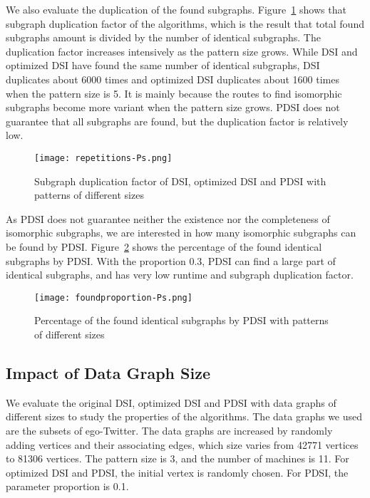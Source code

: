 We also evaluate the duplication of the found subgraphs. Figure~\ref{fig:repetitions-P} shows that subgraph duplication factor of the algorithms, which is the result that total found subgraphs amount is divided by the number of identical subgraphs. The duplication factor increases intensively as the pattern size grows. While DSI and optimized DSI have found the same number of identical subgraphs, DSI duplicates about 6000 times and optimized DSI duplicates about 1600 times when the pattern size is 5. It is mainly because the routes to find isomorphic subgraphs become more variant when the pattern size grows. PDSI does not guarantee that all subgraphs are found, but the duplication factor is relatively low.

\begin{figure}[H]
  \begin{center}
    \texttt{[image: repetitions-Ps.png]}
    \caption{Subgraph duplication factor of DSI, optimized DSI and PDSI with patterns of different sizes}
    \label{fig:repetitions-P}
  \end{center}
\end{figure}

As PDSI does not guarantee neither the existence nor the completeness of isomorphic subgraphs, we are interested in how many isomorphic subgraphs can be found by PDSI. Figure~\ref{fig:foundproportion-P} shows the percentage of the found identical subgraphs by PDSI. With the proportion 0.3, PDSI can find a large part of identical subgraphs, and has very low runtime and subgraph duplication factor.

\begin{figure}[H]
  \begin{center}
    \texttt{[image: foundproportion-Ps.png]}
    \caption{Percentage of the found identical subgraphs by PDSI with patterns of different sizes}
    \label{fig:foundproportion-P}
  \end{center}
\end{figure}

\subsection{Impact of Data Graph Size}

We evaluate the original DSI, optimized DSI and PDSI with data graphs of different sizes to study the properties of the algorithms. The data graphs we used are the subsets of ego-Twitter. The data graphs are increased by randomly adding vertices and their associating edges, which size varies from 42771 vertices to 81306 vertices. The pattern size is 3, and the number of machines is 11. For optimized DSI and PDSI, the initial vertex is randomly chosen. For PDSI, the parameter proportion is 0.1.

